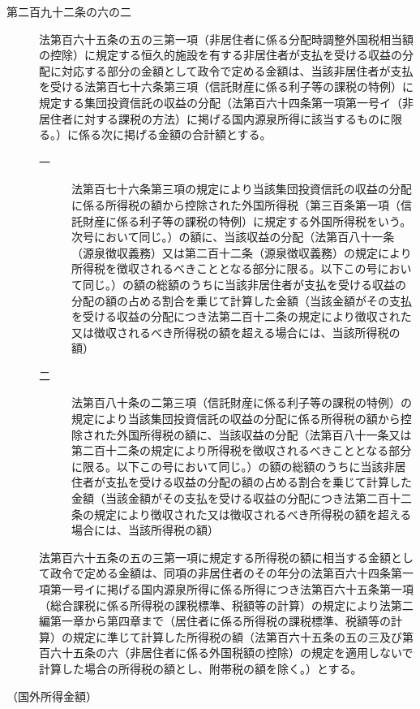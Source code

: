 \documentclass[twocolumn,a4j,10pt]{ltjtarticle}
\begin{document}
\begin{description}
\item[第二百九十二条の六の二]法第百六十五条の五の三第一項（非居住者に係る分配時調整外国税相当額の控除）に規定する恒久的施設を有する非居住者が支払を受ける収益の分配に対応する部分の金額として政令で定める金額は、当該非居住者が支払を受ける法第百七十六条第三項（信託財産に係る利子等の課税の特例）に規定する集団投資信託の収益の分配（法第百六十四条第一項第一号イ（非居住者に対する課税の方法）に掲げる国内源泉所得に該当するものに限る。）に係る次に掲げる金額の合計額とする。
\begin{description}
\item[一]法第百七十六条第三項の規定により当該集団投資信託の収益の分配に係る所得税の額から控除された外国所得税（第三百条第一項（信託財産に係る利子等の課税の特例）に規定する外国所得税をいう。次号において同じ。）の額に、当該収益の分配（法第百八十一条（源泉徴収義務）又は第二百十二条（源泉徴収義務）の規定により所得税を徴収されるべきこととなる部分に限る。以下この号において同じ。）の額の総額のうちに当該非居住者が支払を受ける収益の分配の額の占める割合を乗じて計算した金額（当該金額がその支払を受ける収益の分配につき法第二百十二条の規定により徴収された又は徴収されるべき所得税の額を超える場合には、当該所得税の額）
\item[二]法第百八十条の二第三項（信託財産に係る利子等の課税の特例）の規定により当該集団投資信託の収益の分配に係る所得税の額から控除された外国所得税の額に、当該収益の分配（法第百八十一条又は第二百十二条の規定により所得税を徴収されるべきこととなる部分に限る。以下この号において同じ。）の額の総額のうちに当該非居住者が支払を受ける収益の分配の額の占める割合を乗じて計算した金額（当該金額がその支払を受ける収益の分配につき法第二百十二条の規定により徴収された又は徴収されるべき所得税の額を超える場合には、当該所得税の額）
\end{description}
\item[]法第百六十五条の五の三第一項に規定する所得税の額に相当する金額として政令で定める金額は、同項の非居住者のその年分の法第百六十四条第一項第一号イに掲げる国内源泉所得に係る所得につき法第百六十五条第一項（総合課税に係る所得税の課税標準、税額等の計算）の規定により法第二編第一章から第四章まで（居住者に係る所得税の課税標準、税額等の計算）の規定に準じて計算した所得税の額（法第百六十五条の五の三及び第百六十五条の六（非居住者に係る外国税額の控除）の規定を適用しないで計算した場合の所得税の額とし、附帯税の額を除く。）とする。
\end{description}
\noindent\hspace{10pt}（国外所得金額）
\end{document}
